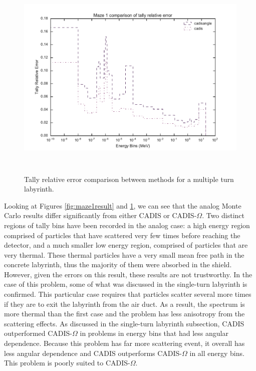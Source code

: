 \begin{figure}[h!]
  \centering
  \includegraphics[height=10cm]{./chapters/characterization_probs/figures/char/maze1/maze_1_tally_error_compare.pdf}
  \caption[Tally relative error comparison between methods for multiple turn labyrinth]
  {Tally relative error comparison between methods for a multiple turn
  labyrinth. }
  \label{fig:maze1error}
\end{figure}

Looking at Figures \ref{fig:maze1result} and \ref{fig:maze1error}, we can see
that the analog Monte Carlo results differ significantly from either CADIS or
CADIS-$\Omega$. Two distinct regions of tally bins have been recorded in the
analog case: a high energy region comprised of particles that have scattered
very few times before reaching the detector, and a much smaller low energy
region, comprised of particles that are very thermal. These thermal particles
have a very small mean free path in the concrete labyrinth, thus the majority of them were
absorbed in the shield. However, given the errors on this result, these results are
not trustworthy. In the case of this problem, some of what was discussed in the
single-turn labyrinth is confirmed. This particular case requires that particles
scatter several more times if they are to exit the labyrinth from the air duct.
As a result, the spectrum is more thermal than the first case and the problem
has less anisotropy from the scattering effects.
As discussed in the single-turn labyrinth subsection, CADIS
outperformed CADIS-$\Omega$ in problems in energy bins that had less angular
dependence. Because this problem has far more scattering event, it overall has
less angular dependence and CADIS outperforms CADIS-$\Omega$ in all energy bins.
This problem is poorly suited to CADIS-$\Omega$.

